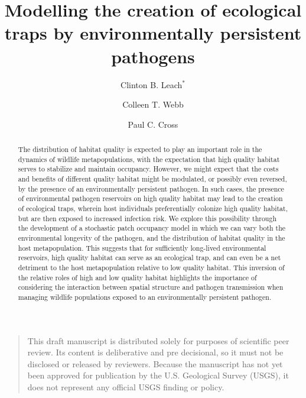 \documentclass{article}
\begin{document}
\title{Modelling the creation of ecological traps by environmentally persistent pathogens}

\author[1]{Clinton B. Leach$^*$}
\author[1]{Colleen T. Webb}
\author[2]{Paul C. Cross}


\maketitle


\begin{quote}
This draft manuscript is distributed solely for purposes of scientific peer review.  Its content is deliberative and pre decisional, so it must not be disclosed or released by reviewers.  Because the manuscript has not yet been approved for publication by the U.S. Geological Survey (USGS), it does not represent any official USGS finding or policy.
\end{quote}


\begin{abstract} 
The distribution of habitat quality is expected to play an important role in the dynamics of wildlife metapopulations, with the expectation that high quality habitat serves to stabilize and maintain occupancy.  However, we might expect that the costs and benefits of different quality habitat might be modulated, or possibly even reversed, by the presence of an environmentally persistent pathogen.  In such cases, the presence of environmental pathogen reservoirs on high quality habitat may lead to the creation of ecological traps, wherein host individuals preferentially colonize high quality habitat, but are then exposed to increased infection risk.  We explore this possibility through the development of a stochastic patch occupancy model in which we can vary both the environmental longevity of the pathogen, and the distribution of habitat quality in the host metapopulation.  This suggests that for sufficiently long-lived environmental reservoirs, high quality habitat can serve as an ecological trap, and can even be a net detriment to the host metapopulation relative to low quality habitat.  This inversion of the relative roles of high and low quality habitat highlights the importance of considering the interaction between spatial structure and pathogen transmission when managing wildlife populations exposed to an environmentally persistent pathogen.
\end{abstract}
\end{document}

